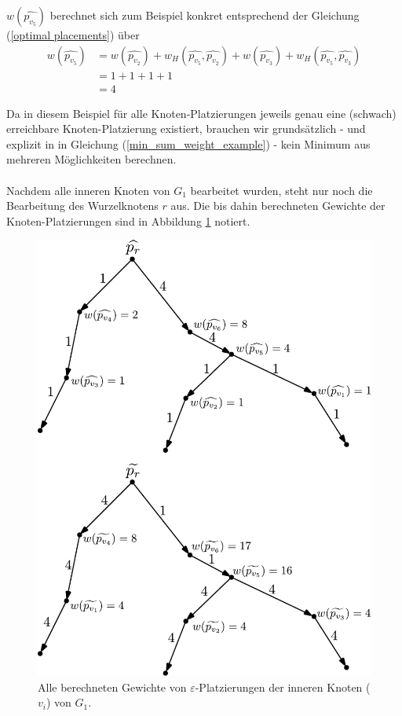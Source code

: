 \documentclass[a4paper, 12pt, twoside]{article}
\theoremstyle{Format1} %
\begin{document}
$w(\widehat{p_{v_5}})$ berechnet sich zum Beispiel konkret entsprechend der Gleichung (\ref{optimal placements}) über
\begin{equation} \label{min_sum_weight_example}
	\begin{split}
		w(\widehat{p_{v_5}}) & = w(\widehat{p_{v_2}}) + w_H(\widehat{p_{v_5}}, \widehat{p_{v_2}}) + w(\widehat{p_{v_3}}) + w_H(\widehat{p_{v_5}}, \widehat{p_{v_3}}) \\
		& = 1 + 1 + 1 + 1 \\
		& = 4
	\end{split}
\end{equation}

Da in diesem Beispiel für alle Knoten-Platzierungen jeweils genau eine (schwach) erreichbare Knoten-Platzierung existiert, brauchen wir grundsätzlich - und explizit in in Gleichung (\ref{min_sum_weight_example}) -
kein Minimum aus mehreren Möglichkeiten berechnen.
\\
\\
Nachdem alle inneren Knoten von $G_1$ bearbeitet wurden, steht nur noch die Bearbeitung des Wurzelknotens $r$ aus.
Die bis dahin berechneten Gewichte der Knoten-Platzierungen sind in Abbildung \ref{min_sum_tree_h_1} notiert.

\begin{figure}[H]
	\centering
	\includegraphics[width=.8\textwidth]{min_sum_tree_h_1.pdf}
	\caption{
		Alle berechneten Gewichte von $\varepsilon$-Platzierungen der inneren Knoten ($v_i$) von $G_1$.
	}
    \label{min_sum_tree_h_1}
\end{figure}
\end{document}

